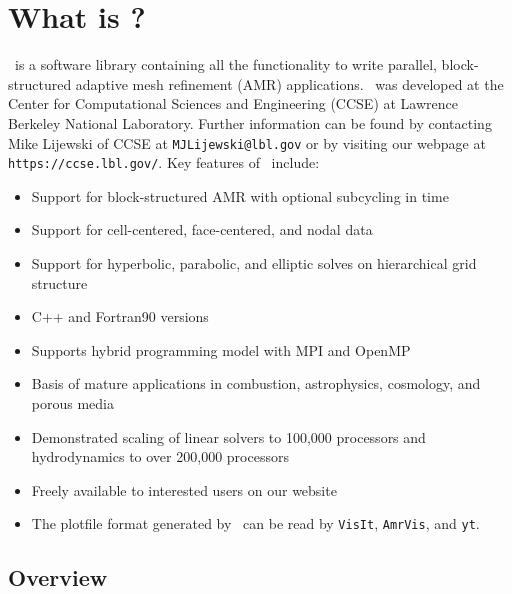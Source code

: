 \section{What is \BoxLib?}

\BoxLib\ is a software library containing all the functionality to write parallel, 
block-structured adaptive mesh refinement (AMR) applications.  \BoxLib\ was developed 
at the Center for Computational Sciences and Engineering (CCSE) at Lawrence Berkeley 
National Laboratory.  Further information can be found by contacting Mike Lijewski 
of CCSE at {\tt MJLijewski@lbl.gov} or by visiting our webpage
at {\tt https://ccse.lbl.gov/}.  Key features of \BoxLib\ include:

\begin{itemize}
\item Support for block-structured AMR with optional subcycling in time
\item Support for cell-centered, face-centered, and nodal data
\item Support for hyperbolic, parabolic, and elliptic solves on hierarchical grid structure
\item C++ and Fortran90 versions
\item Supports hybrid programming model with MPI and OpenMP
\item Basis of mature applications in combustion, astrophysics, cosmology, and porous media
\item Demonstrated scaling of linear solvers to 100,000 processors and 
      hydrodynamics to over 200,000 processors
\item Freely available to interested users on our website
\item The plotfile format generated by \BoxLib\ can be read by {\tt VisIt}, {\tt AmrVis},
      and {\tt yt}.
\end{itemize}

\subsection{Overview}

